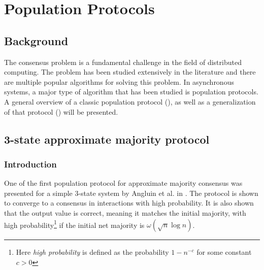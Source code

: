 \section{Population Protocols} \label{Section3}
\subsection{Background}

The consensus problem is a fundamental challenge in the field of distributed computing. The problem has been studied extensively in the literature and there are multiple popular algorithms for solving this problem. In asynchronous systems, a major type of algorithm that has been studied is population protocols. A general overview of a classic population protocol (\cite{angluinSimplePopulationProtocol2008}), as well as a generalization of that protocol (\cite{AspnesFastConverganceOfKOpinion2023}) will be presented. 


\subsection{3-state approximate majority protocol} \label{3stateApproximatemajority}
\subsubsection{Introduction} \label{angluinIntroduction}

One of the first population protocol for approximate majority consensus was presented for a simple 3-state system by Angluin et al. in \cite{angluinSimplePopulationProtocol2008}. The protocol is shown to converge to a consensus in  interactions with high probability. It is also shown that the output value is correct, meaning it matches the initial majority, with high probability\footnote{Here \emph{high probability} is defined as the probability $1 - n^{-c}$ for some constant $c > 0$} if the initial net majority is $\omega(\sqrt{n} \log n)$.

